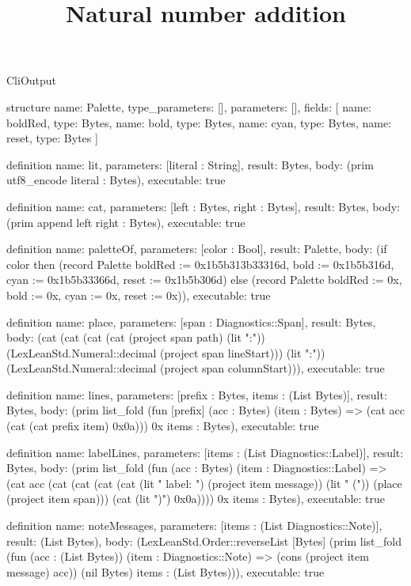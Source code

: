 \begin{lexlean}{CliOutput}
\title{Natural number addition}
\begin{semanticmodule}
structure{
  name: Palette,
  type_parameters: [],
  parameters: [],
  fields: [
    {name: boldRed, type: Bytes},
    {name: bold, type: Bytes},
    {name: cyan, type: Bytes},
    {name: reset, type: Bytes}
  ]
}

definition{
  name: lit,
  parameters: [literal : String],
  result: Bytes,
  body: (prim utf8_encode literal : Bytes),
  executable: true
}

definition{
  name: cat,
  parameters: [left : Bytes, right : Bytes],
  result: Bytes,
  body: (prim append left right : Bytes),
  executable: true
}

definition{
  name: paletteOf,
  parameters: [color : Bool],
  result: Palette,
  body: (if color then (record Palette {boldRed := 0x1b5b313b33316d, bold := 0x1b5b316d, cyan := 0x1b5b33366d, reset := 0x1b5b306d}) else (record Palette {boldRed := 0x, bold := 0x, cyan := 0x, reset := 0x})),
  executable: true
}

definition{
  name: place,
  parameters: [span : Diagnostics::Span],
  result: Bytes,
  body: (cat (cat (cat (cat (project span path) (lit ":")) (LexLeanStd.Numeral::decimal (project span lineStart))) (lit ":")) (LexLeanStd.Numeral::decimal (project span columnStart))),
  executable: true
}

definition{
  name: lines,
  parameters: [prefix : Bytes, items : (List Bytes)],
  result: Bytes,
  body: (prim list_fold (fun [prefix] (acc : Bytes) (item : Bytes) => (cat acc (cat (cat prefix item) 0x0a))) 0x items : Bytes),
  executable: true
}

definition{
  name: labelLines,
  parameters: [items : (List Diagnostics::Label)],
  result: Bytes,
  body: (prim list_fold (fun (acc : Bytes) (item : Diagnostics::Label) => (cat acc (cat (cat (cat (cat (lit "  label: ") (project item message)) (lit " (")) (place (project item span))) (cat (lit ")") 0x0a)))) 0x items : Bytes),
  executable: true
}

definition{
  name: noteMessages,
  parameters: [items : (List Diagnostics::Note)],
  result: (List Bytes),
  body: (LexLeanStd.Order::reverseList [Bytes] (prim list_fold (fun (acc : (List Bytes)) (item : Diagnostics::Note) => (cons (project item message) acc)) (nil Bytes) items : (List Bytes))),
  executable: true
}


\end{semanticmodule}
\end{lexlean}
